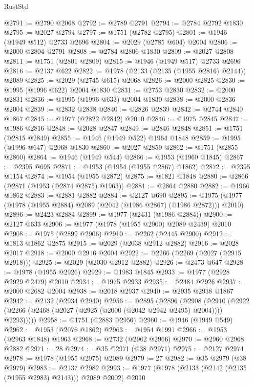\begin{lexlean}{RustStd}
\begin{coremodule}
{\begin{coremodule}
{{{{{{{{{{{{{{{{{{{{{{{{{{{{{{{@2791 := @2790 @2068
@2792 := @2789 @2791
@2794 := @2784 @2792 @1830
@2795 := @2027 @2794
@2797 := @1751 (@2782 @2795)
@2801 := @1946 (@1949 @512) @2733 @2696
@2804 := @2029 (@2785 @604) @2004
@2806 := @2000 @2804 @2791
@2808 := @2784 @2806 @1830
@2809 := @2027 @2808
@2811 := @1751 (@2801 @2809)
@2815 := @1946 (@1949 @517) @2733 @2696
@2816 := @2137 @622
@2822 := @1978 (@2133 (@2135 (@1955 @2816) @2144)) @2089
@2825 := @2029 (@2745 @615) @2068
@2826 := @2000 @2825
@2830 := @1995 (@1996 @622) @2004 @1830
@2831 := @2753 @2830
@2832 := @2000 @2831
@2836 := @1995 (@1996 @633) @2004 @1830
@2838 := @2000 @2836 @2004
@2839 := @2832 @2838
@2840 := @2826 @2839
@2842 := @2744 @2840 @1867
@2845 := @1977 (@2822 @2842) @2010
@2846 := @1975 @2845
@2847 := @1986 @2816
@2848 := @2028 @2847
@2849 := @2846 @2848
@2851 := @1751 (@2815 @2849)
@2855 := @1946 (@1949 @522) @1964 @1848
@2859 := @1995 (@1996 @647) @2068 @1830
@2860 := @2027 @2859
@2862 := @1751 (@2855 @2860)
@2864 := @1946 (@1949 @544)
@2866 := @1953 (@1960 @1845)
@2867 := @2395 @695
@2871 := @1953 (@1954 (@1955 @2867) @1862)
@2872 := @2395 @1154
@2874 := @1954 (@1955 @2872)
@2875 := @1821 @1848
@2880 := @2866 (@2871 (@1953 (@2874 @2875) @1963))
@2881 := @2864 @2880
@2882 := @1966 @1862
@2883 := @2881 @2882
@2884 := @2127 @690
@2895 := @1975 (@1977 (@1978 (@1955 @2884) @2089 (@2042 (@1986 @2867) (@1986 @2872))) @2010)
@2896 := @2423 @2884
@2899 := @1977 (@2431 (@1986 @2884))
@2900 := @2127 @633
@2906 := @1977 (@1978 (@1955 @2900) @2089 @2439) @2010
@2908 := @1975 (@2899 @2906)
@2910 := @2262 (@2445 @2900)
@2912 := @1813 @1862 @2875
@2915 := @2029 (@2038 @2912 @2882)
@2916 := @2028 @2017
@2918 := @2000 @2916 @2004
@2922 := @2266 (@2269 (@2027 (@2915 @2918)))
@2925 := @2029 (@2030 @2912 @2882)
@2926 := @2473 @647
@2928 := @1978 (@1955 @2926)
@2929 := @1983 @1845
@2933 := @1977 (@2928 @2929 @2479) @2010
@2934 := @1975 @2933
@2935 := @2484 @2926
@2937 := @2000 @2682 @2004
@2938 := @2018 @2937
@2940 := @2935 @2938 @1867
@2942 := @2132 (@2934 @2940)
@2956 := @2895
    (@2896
      (@2908
        (@2910 (@2922 (@2266 (@2468 (@2027 (@2925 (@2000 (@2042 @2942 @2495) @2004)))) @2293)))))
@2958 := @1751 (@2883 @2956)
@2960 := @1946 (@1949 @549)
@2962 := @1953 (@2076 @1862)
@2963 := @1954 @1991
@2966 := @1953 (@2963 @1848) @1963
@2968 := @2732 (@2962 @2966)
@2970 := @2960 @2968 @2882
@2971 := 28
@2974 := @35 @2971 (@38 @2971)
@2975 := @2127 @2974
@2978 := @1978 (@1955 @2975) @2089
@2979 := 27
@2982 := @35 @2979 (@38 @2979)
@2983 := @2137 @2982
@2993 := @1977 (@1978 (@2133 (@2142 (@2135 (@1955 @2983) @2143))) @2089 @2002) @2010
}}}}}}}}}}}}}}}}}}}}}}}}}}}}}}}
\end{coremodule}}
\end{coremodule}
\end{lexlean}
